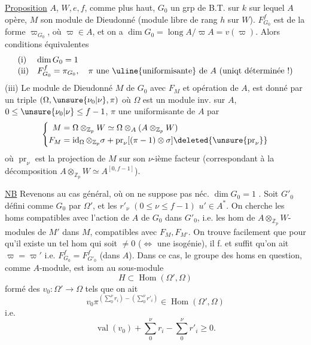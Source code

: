\uline{Proposition} $A$,  $W,e,f$,  comme plus haut, $G_0$ un grp de B.T.  sur  $k$ sur lequel $A$ opère,  $M$ son module de Dieudonné (module libre de rang $h$ sur $W$).
$F_{G_0}^f$ est de la forme $\varpi_{G_0}$, où $\varpi\in A$, et on a $\dim G_0=\operatorname{long}A/\varpi A=v(\varpi)$.
Alors  conditions équivalentes
\[
\begin{array}{ll}
\text{(i)}&\dim G_0=1\\
\text{(ii)}&F_{G_0}^f=\pi_{G_0},\quad\pi\ \text{une \uline{uniformisante} de }A\ \text{(uniqt déterminée !)}
\end{array}
\]
(iii) Le module de Dieudonné $M$ de $G_0$  avec $F_M$ et opération de $A$, est donné par un triple $(\Omega,\unsure{\nu_0|\nu},\pi)$ où $\Omega$ est un module inv. sur $A$, $0\leq\unsure{\nu_0|\nu}\leq f-1$, $\pi$ une uniformisante de $A$ par
\[
\left\{\begin{aligned}
M&=\Omega\otimes_{\mathbb Z_p}W\simeq\Omega\otimes_A(A\otimes_{\mathbb Z_p}W)\\
F_M&=\operatorname{id}_\Omega\otimes_{\mathbb Z_p}\sigma+\operatorname{pr}_\nu[(\pi-1)\otimes\sigma]\deleted{\unsure{\operatorname{pr}_\nu}}
\end{aligned}\right.
\]
où $\operatorname{pr}_\nu$ est la  projection de $M$ sur son $\nu$-ième facteur  (correspondant à la décomposition $A\otimes_{\mathbb Z_p}W\simeq A^{[0,f-1]}$).


\uline{NB} Revenons au cas général, où on ne suppose pas néc. $\dim G_0=1$ . Soit $G'_0$ défini comme $G_0$ par $\Omega'$, et les $r'_\nu$ $(0\leq\nu\leq f-1)$ $u'\in A^*$. On cherche les homs compatibles avec l'action de $A$ de $G_0$ dans $G'_0$, i.e. les hom de $A\otimes_{\mathbb Z_p}W$-modules de $M'$ dans $M$, compatibles avec $F_M,F_{M'}$. On trouve facilement que pour qu'il existe un tel hom qui soit $\ne0$ ($\Longleftrightarrow$ une isogénie), il f. et suffit qu'on ait $\varpi=\varpi'$ i.e. $F_{G_0}^f=F_{G'_0}^f$ (dans $A$). Dans ce cas, le groupe des homs en question, comme $A$-module, est isom au  sous-module
\[
H\subset\operatorname{Hom}(\Omega',\Omega)
\]
formé des $v_0:\Omega'\longrightarrow\Omega$ tels que  on ait
\[
v_0\pi^{(\sum_0^\nu r_i)-(\sum_0^\nu r'_i)}\in\operatorname{Hom}(\Omega',\Omega)
\]
i.e.
\[
\operatorname{val}(v_0)+\sum_0^\nu r_i-\sum_0^\nu r'_i\geq0.
\]

